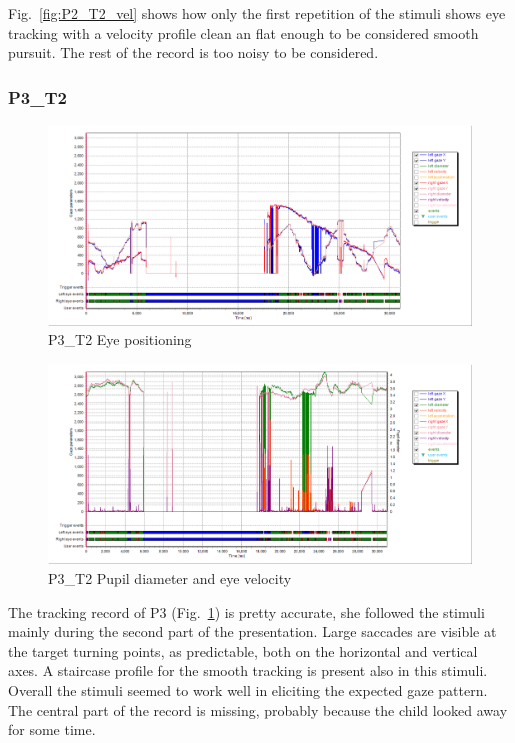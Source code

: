 Fig.~\ref{fig:P2_T2_vel} shows how only the first repetition of the stimuli shows eye tracking with a velocity profile clean an flat enough to be considered smooth pursuit. The rest of the record is too noisy to be considered.




\subsubsection{P3\_T2}
\label{sec:P3_T2}

\begin{figure}[t]
  \centering
  \includegraphics[width=.8\textwidth]{figures/graphs/P3_T2(triangular)_XY.png}
  \caption[P3\_T2 Eye positioning]{P3\_T2 Eye positioning}
  \label{fig:P3_T2_pos}
\end{figure}

\begin{figure}[t]
  \centering
  \includegraphics[width=.8\textwidth]{figures/graphs/P3_T2(triangular)_VP.png}
  \caption[P3\_T2 Pupil size and velocity profile]{P3\_T2 Pupil diameter and eye velocity}
  \label{fig:P3_T2_vel}
\end{figure}

The tracking record of P3 (Fig.~\ref{fig:P3_T2_pos}) is pretty accurate, she followed the stimuli mainly during the second part of the presentation. Large saccades are visible at the target turning points, as predictable, both on the horizontal and vertical axes. A staircase profile for the smooth tracking is present also in this stimuli. Overall the stimuli seemed to work  well in eliciting the expected gaze pattern. The central part of the record is missing, probably because the child looked away for some time.

